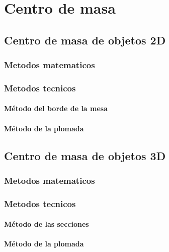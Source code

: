 \documentclass[16pt,]{krantz}
\theoremstyle{definition}
\theoremstyle{definition}
\theoremstyle{definition}
\theoremstyle{definition}
\theoremstyle{remark}
\begin{document}
\hypertarget{centro-de-masa}{%
\chapter{Centro de masa}\label{centro-de-masa}}

\hypertarget{centro-de-masa-de-objetos-2d}{%
\section{Centro de masa de objetos 2D}\label{centro-de-masa-de-objetos-2d}}

\hypertarget{metodos-matematicos}{%
\subsection{Metodos matematicos}\label{metodos-matematicos}}

\hypertarget{metodos-tecnicos}{%
\subsection{Metodos tecnicos}\label{metodos-tecnicos}}

\hypertarget{muxe9todo-del-borde-de-la-mesa}{%
\subsubsection{Método del borde de la mesa}\label{muxe9todo-del-borde-de-la-mesa}}

\hypertarget{muxe9todo-de-la-plomada}{%
\subsubsection{Método de la plomada}\label{muxe9todo-de-la-plomada}}

\hypertarget{centro-de-masa-de-objetos-3d}{%
\section{Centro de masa de objetos 3D}\label{centro-de-masa-de-objetos-3d}}

\hypertarget{metodos-matematicos-1}{%
\subsection{Metodos matematicos}\label{metodos-matematicos-1}}

\hypertarget{metodos-tecnicos-1}{%
\subsection{Metodos tecnicos}\label{metodos-tecnicos-1}}

\hypertarget{muxe9todo-de-las-secciones}{%
\subsubsection{Método de las secciones}\label{muxe9todo-de-las-secciones}}

\hypertarget{muxe9todo-de-la-plomada-1}{%
\subsubsection{Método de la plomada}\label{muxe9todo-de-la-plomada-1}}



\printindex
\end{document}
